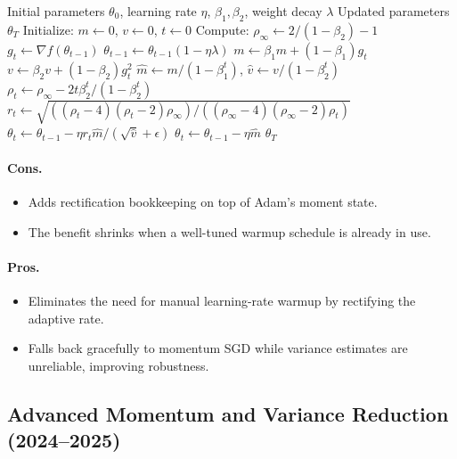 \begin{algorithm}[H]
\caption{RAdam (Rectified Adam)}
\label{alg:radam}
\begin{algorithmic}[1]
\Require Initial parameters $\theta_0$, learning rate $\eta$, $\beta_1, \beta_2$, weight decay $\lambda$
\Ensure Updated parameters $\theta_T$
\State Initialize: $m \gets 0$, $v \gets 0$, $t \gets 0$
\State Compute: $\rho_\infty \gets 2/(1-\beta_2) - 1$
    \State $g_t \gets \nabla f(\theta_{t-1})$
        \State $\theta_{t-1} \gets \theta_{t-1}(1 - \eta\lambda)$
    \EndIf
    \State $m \gets \beta_1 m + (1-\beta_1) g_t$
    \State $v \gets \beta_2 v + (1-\beta_2) g_t^2$
    \State $\hat{m} \gets m/(1-\beta_1^t)$, $\hat{v} \gets v/(1-\beta_2^t)$
    \State $\rho_t \gets \rho_\infty - 2t \beta_2^t / (1 - \beta_2^t)$
        \State $r_t \gets \sqrt{((\rho_t-4)(\rho_t-2)\rho_\infty) / ((\rho_\infty-4)(\rho_\infty-2)\rho_t)}$
        \State $\theta_t \gets \theta_{t-1} - \eta r_t \hat{m} / (\sqrt{\hat{v}} + \epsilon)$
    \Else
        \State $\theta_t \gets \theta_{t-1} - \eta \hat{m}$ 
    \EndIf
\EndFor
\Return $\theta_T$
\end{algorithmic}
\end{algorithm}

\paragraph{Cons.}
\begin{itemize}[leftmargin=*]
\item Adds rectification bookkeeping on top of Adam's moment state.
\item The benefit shrinks when a well-tuned warmup schedule is already in use.
\end{itemize}

\paragraph{Pros.}
\begin{itemize}[leftmargin=*]
\item Eliminates the need for manual learning-rate warmup by rectifying the adaptive rate.
\item Falls back gracefully to momentum SGD while variance estimates are unreliable, improving robustness.
\end{itemize}

\subsection{Advanced Momentum and Variance Reduction (2024--2025)}
